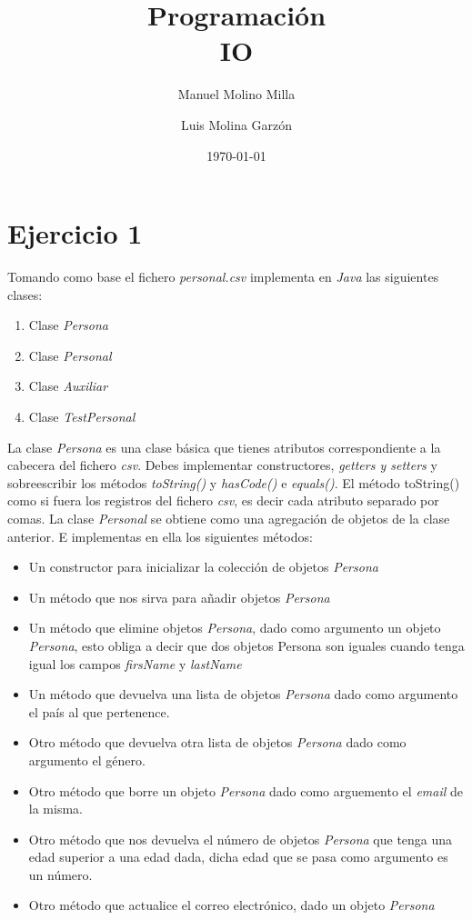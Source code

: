 \documentclass[4paper]{article}
\author{Manuel Molino Milla \and Luis Molina Garzón}
\title{\textbf{Programación}
\\IO}
\date{\today}
\begin{document}
\maketitle


\section*{Ejercicio 1}
Tomando como base el fichero \emph{personal.csv} implementa en \emph{Java} las siguientes clases:
\begin{enumerate}
\item Clase \emph{Persona}
\item Clase \emph{Personal}
\item Clase \emph{Auxiliar}
\item Clase \textit{TestPersonal}
\end{enumerate}
La clase \emph{Persona} es una clase básica que tienes atributos correspondiente a la cabecera del fichero \emph{csv}. Debes implementar constructores, \emph{getters y setters} y sobreescribir los métodos \emph{toString()} y \emph{hasCode()} e \emph{equals()}. El método toString() como si fuera los registros del fichero \emph{csv}, es decir cada atributo separado por comas.
La clase \emph{Personal} se obtiene como una agregación de objetos de la clase anterior. E implementas en ella los siguientes métodos:
\begin{itemize}
\item Un constructor para inicializar la colección de objetos \emph{Persona}
\item Un método que nos sirva para añadir objetos \emph{Persona}
\item Un método que elimine objetos \emph{Persona}, dado como argumento un objeto \emph{Persona}, esto obliga a decir que dos objetos Persona son iguales cuando tenga igual los campos \emph{firsName} y \emph{lastName}
\item Un método que devuelva una lista de objetos \emph{Persona} dado como argumento el país al que pertenence.
\item Otro método que devuelva otra lista de objetos \emph{Persona} dado como argumento el género.
\item Otro método que borre un objeto \emph{Persona} dado como arguemento el \emph{email} de la misma.
\item Otro método que nos devuelva el número de objetos \emph{Persona} que tenga una edad superior a una edad dada, dicha edad que se pasa como argumento es un número.
\item Otro método que actualice el correo electrónico, dado un objeto \emph{Persona}
\end{itemize}
\end{document}
